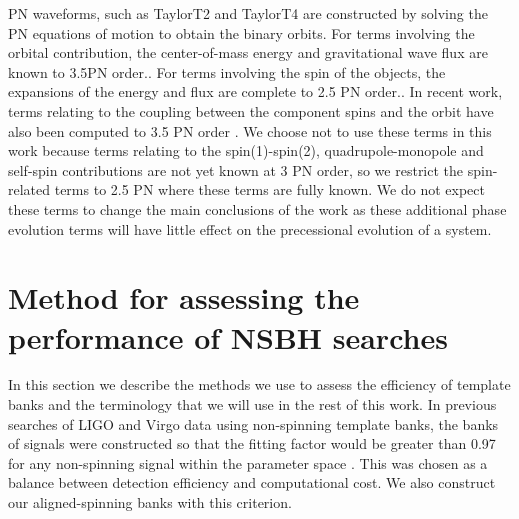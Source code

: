 \ac{PN} waveforms, such as TaylorT2 and TaylorT4 are constructed by solving the
\ac{PN} equations of motion to obtain the binary orbits. For terms involving the orbital
contribution, the center-of-mass energy and gravitational wave flux are known 
to 3.5\ac{PN} order.\cite{Wiseman:1993aj,Blanchet:1995fg,Blanchet:1995ez,Blanchet:1996pi,
Blanchet:2001ax, Blanchet:2004ek}. For terms
involving the spin of the objects, the expansions of the energy and
flux are complete to 2.5 \ac{PN} order.\cite{Kidder:1992fr,Kidder:1995zr,Arun:2008kb}. In recent work,
terms relating to the coupling between the component spins and the orbit have
also been computed to 3.5 \ac{PN} order \cite{Blanchet:2012sm,Bohe:2013cla}. We
choose not to use these terms in this work because terms relating to the
spin(1)-spin(2), quadrupole-monopole and self-spin contributions are not yet
known at 3 \ac{PN} order, so we restrict the spin-related terms to 2.5 \ac{PN}
where these terms are fully known. We do not expect these terms to change the 
main conclusions of the work as these additional phase evolution terms will 
have little effect on the precessional evolution of a system.

\section{Method for assessing the performance of NSBH searches}
\label{sec:bank_testing}

In this section we describe the methods we use to assess the efficiency of
template banks and the terminology that we will use in the rest of this work.
In previous searches of LIGO and Virgo data using
non-spinning template banks, the banks of signals were constructed so that the
fitting factor would be greater than 0.97 for any non-spinning signal within
the parameter space \cite{Babak:2012zx}. This was chosen as a balance between
detection efficiency and computational cost. We also construct our 
aligned-spinning banks with this criterion.

